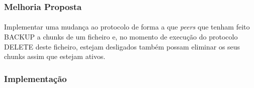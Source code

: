 \documentclass[11pt,oneside]{book}
\begin{document}
\subsubsection{Melhoria Proposta}
\paragraph{}
Implementar uma mudança ao protocolo de forma a que \textit{peers} que tenham
feito BACKUP a chunks de um ficheiro e, no momento de execução do protocolo 
DELETE deste ficheiro, estejam desligados também possam eliminar os seus chunks 
assim que estejam ativos.

\subsubsection{Implementação}
\end{document}
